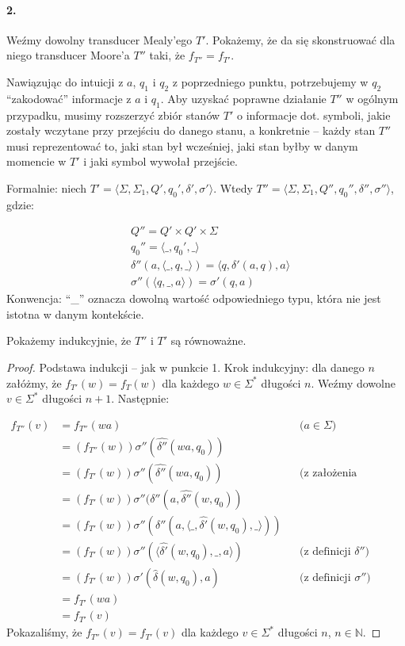 \documentclass{article}
\begin{document}
\newpage

\paragraph{2.}
Weźmy dowolny transducer Mealy'ego $T'$.
Pokażemy, że da się skonstruować dla niego transducer Moore'a $T''$
taki, że $f_{T''} = f_{T'}$.

Nawiązując do intuicji z $a$, $q_1$ i $q_2$ z poprzedniego punktu,
potrzebujemy w $q_2$ \enquote{zakodować} informacje z $a$ i $q_1$.
Aby uzyskać poprawne działanie $T''$ w ogólnym przypadku,
musimy rozszerzyć zbiór stanów $T'$ o informacje dot.
symboli, jakie zostały wczytane przy przejściu do danego stanu,
a konkretnie -- każdy stan $T''$ musi reprezentować to,
jaki stan był wcześniej,
jaki stan byłby w danym momencie w $T'$
i jaki symbol wywołał przejście.

Formalnie: niech
$T' = \langle \Sigma, \Sigma_1, Q', q_0', \delta', \sigma' \rangle$.
Wtedy
$T'' = \langle \Sigma, \Sigma_1, Q'', q_0'', \delta'', \sigma'' \rangle$, gdzie:

\begin{align*}
    & Q'' = Q' \times Q' \times \Sigma \\
    & q_0'' = \langle \_, q_0', \_ \rangle \\
    & \delta''(a, \langle \_, q, \_ \rangle)
    = \langle q, \delta'(a, q), a \rangle \\
    & \sigma''(\langle q, \_, a \rangle) = \sigma'(q, a)
\end{align*}
Konwencja: \enquote{\_} oznacza dowolną wartość odpowiedniego typu,
która nie jest istotna w danym kontekście.

Pokażemy indukcyjnie, że $T''$ i $T'$ są równoważne.

\begin{proof}
Podstawa indukcji -- jak w punkcie 1.
Krok indukcyjny: dla danego $n$ załóżmy,
że $f_{T'}(w) = f_T(w)$
dla każdego $w \in \Sigma^*$ długości $n$.
Weźmy dowolne $v \in \Sigma^*$ długości $n + 1$.
Następnie:

\begin{align*}
    f_{T''}(v) & = f_{T''}(wa)
    && \text{($a \in \Sigma$)} \\
    & = (f_{T''}(w))\sigma''(\hat{\delta''}(wa, q_0)) \\
    & = (f_{T'}(w))\sigma''(\hat{\delta''}(wa, q_0))
    && \text{(z założenia indukcyjnego)} \\
    & = (f_{T'}(w))\sigma''(\delta''(a, \hat{\delta''}(w, q_0)) \\
    & = (f_{T'}(w))\sigma''(\delta''(
        a, \langle \_, \hat{\delta'}(w, q_0), \_ \rangle
    )) \\
    & = (f_{T'}(w))\sigma''(
        \langle \hat{\delta'}(w, q_0), \_, a \rangle
    )
    && \text{(z definicji $\delta''$)} \\
    & = (f_{T'}(w))\sigma'(\hat{\delta}(w, q_0), a)
    && \text{(z definicji $\sigma''$)} \\
    & = f_{T'}(wa) \\
    & = f_{T'}(v)
\end{align*}
Pokazaliśmy, że $f_{T''}(v) = f_{T'}(v)$
dla każdego $v \in \Sigma^*$ długości $n$, $n \in \mathbb{N}$.
\end{proof}
\end{document}
